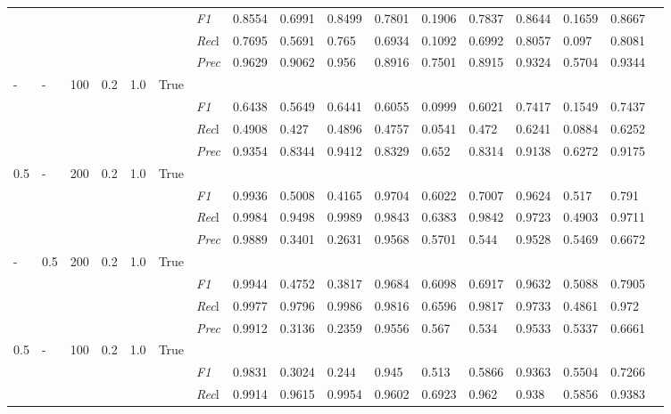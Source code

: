 \begin{table}[]
\begin{tabularx}{\textwidth}{XXXXXX|X|XXX|XXX|XXXX}
& & & & & & \textit{F1} & 0.8554 & 0.6991 & 0.8499 & 0.7801 & 0.1906        & 0.7837        & 0.8644        & 0.1659        & 0.8667        \\
& & & & & & \textit{Rec}l & 0.7695 & 0.5691 & 0.765    & 0.6934 & 0.1092    & 0.6992    & 0.8057    & 0.097    & 0.8081    \\
& & & & & & \textit{Prec} & 0.9629 & 0.9062 & 0.956 & 0.8916 & 0.7501 & 0.8915 & 0.9324 & 0.5704 & 0.9344 \\ \midrule
- & - & 100 & 0.2 & 1.0 &True & & & & & & & & & \\
& & & & & & \textit{F1} & 0.6438 & 0.5649 & 0.6441 & 0.6055 & 0.0999        & 0.6021        & 0.7417        & 0.1549        & 0.7437        \\
& & & & & & \textit{Rec}l & 0.4908 & 0.427 & 0.4896    & 0.4757 & 0.0541    & 0.472    & 0.6241    & 0.0884    & 0.6252    \\
& & & & & & \textit{Prec} & 0.9354 & 0.8344 & 0.9412 & 0.8329 & 0.652 & 0.8314 & 0.9138 & 0.6272 & 0.9175 \\ \midrule
0.5 & - & 200 & 0.2 & 1.0 &True & & & & & & & & & \\
& & & & & & \textit{F1} & 0.9936 & 0.5008 & 0.4165 & 0.9704 & 0.6022        & 0.7007        & 0.9624        & 0.517        & 0.791        \\
& & & & & & \textit{Rec}l & 0.9984 & 0.9498 & 0.9989    & 0.9843 & 0.6383    & 0.9842    & 0.9723    & 0.4903    & 0.9711    \\
& & & & & & \textit{Prec} & 0.9889 & 0.3401 & 0.2631 & 0.9568 & 0.5701 & 0.544 & 0.9528 & 0.5469 & 0.6672 \\ \midrule
- & 0.5 & 200 & 0.2 & 1.0 &True & & & & & & & & & \\
& & & & & & \textit{F1} & 0.9944 & 0.4752 & 0.3817 & 0.9684 & 0.6098        & 0.6917        & 0.9632        & 0.5088        & 0.7905        \\
& & & & & & \textit{Rec}l & 0.9977 & 0.9796 & 0.9986    & 0.9816 & 0.6596    & 0.9817    & 0.9733    & 0.4861    & 0.972    \\
& & & & & & \textit{Prec} & 0.9912 & 0.3136 & 0.2359 & 0.9556 & 0.567 & 0.534 & 0.9533 & 0.5337 & 0.6661 \\ \midrule
0.5 & - & 100 & 0.2 & 1.0 &True & & & & & & & & & \\
& & & & & & \textit{F1} & 0.9831 & 0.3024 & 0.244 & 0.945 & 0.513        & 0.5866        & 0.9363        & 0.5504        & 0.7266        \\
& & & & & & \textit{Rec}l & 0.9914 & 0.9615 & 0.9954    & 0.9602 & 0.6923    & 0.962    & 0.938    & 0.5856    & 0.9383    \\

\end{tabularx}
\end{table}

